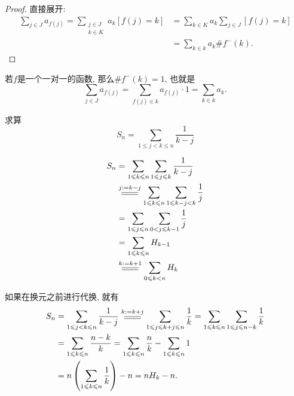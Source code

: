 \documentclass{ctexart}
\begin{document}
\begin{proof}
	直接展开:
	$$
		\begin{aligned} \sum_{j \in J} a_{f(j)}=\sum_{\substack{j \in J \\ k \in K}} a_k[f(j)=k] & =\sum_{k \in K} a_k \sum_{j \in J}[f(j)=k] \\ & =\sum_{k \in k} a_k \# f^{-}(k) .\end{aligned}
	$$
\end{proof}

\begin{example}
	若$f$是一个一对一的函数, 那么$\# f^{-}(k)=1$, 也就是
	$$
		\sum_{j \in J} a_{f(j)}=\sum_{f(j) \in k} a_{f(j)} \cdot 1=\sum_{k \in k} a_k .
	$$
\end{example}

\begin{example}
	求算
	$$
		S_n=\sum_{1 \leqslant j<k \leqslant n} \frac{1}{k-j}
	$$

	$$
		\begin{aligned}
			S_n & =\sum_{1 \leqslant k \leqslant n} \sum_{1 \leqslant j \leqslant k} \frac{1}{k-j}             \\
			    & \varsub{j:=k-j}{0.7cm} \sum_{1 \leqslant k \leqslant n} \sum_{1 \leqslant k-j<k} \frac{1}{j} \\
			    & =\sum_{1 \leqslant j \leqslant n} \sum_{0<j \leqslant k-1} \frac{1}{j}                       \\
			    & =\sum_{1 \leqslant k \leqslant n} H_{k-1}                                                    \\
			    & \varsub{k :=k+1}{0.7cm} \sum_{0 \leqslant k<n} H_k
		\end{aligned}
	$$

	如果在换元之前进行代换, 就有
	$$
		\begin{aligned}
			S_n & =\sum_{1 \leqslant j<k \leqslant n} \frac{1}{k-j} \varsub{k:=k+j}{0.7cm} \sum_{1 \leqslant j \leqslant k+j \leqslant n} \frac{1}{k}=\sum_{1 \leqslant k \leqslant n} \sum_{1 \leqslant j \leqslant n-k} \frac{1}{k} \\
			    & =\sum_{1 \leqslant k \leqslant n} \frac{n-k}{k}=\sum_{1 \leqslant k \leqslant n} \frac{n}{k}-\sum_{1 \leqslant k \leqslant n} 1                                                                                     \\
			    & =n\left(\sum_{1 \leqslant k \leqslant n} \frac{1}{k}\right)-n=n H_k-n .
		\end{aligned}
	$$
\end{example}
\end{document}
